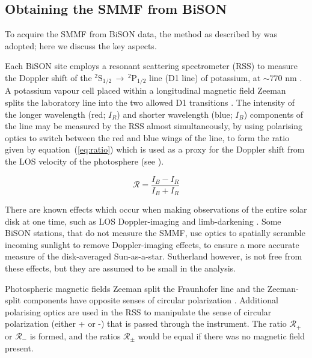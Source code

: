 \subsection{Obtaining the SMMF from BiSON}

To acquire the SMMF from BiSON data, the method as described by \citet{chaplin_studies_2003} was adopted; here we discuss the key aspects.

Each  BiSON site employs a resonant scattering spectrometer (RSS) to measure the Doppler shift of the $^{2}\mathrm{S}_{1/2} \, \rightarrow \, ^{2}\mathrm{P}_{1/2}$ line (D1 line) of potassium, at $\sim 770$ nm \citep{brookes_resonant-scattering_1978}. A potassium vapour cell placed within a longitudinal magnetic field Zeeman splits the laboratory line into the two allowed D1 transitions \citep{lund_spatial_2017}. The intensity of the longer wavelength (red; $I_R$) and shorter wavelength (blue; $I_B$) components of the line may be measured by the RSS almost simultaneously, by using polarising optics to switch between the red and blue wings of the line, to form the ratio given by equation~(\ref{eq:ratio}) which is used as a proxy for the Doppler shift from the LOS velocity of the photosphere (see \citet{brookes_observation_1976, brookes_resonant-scattering_1978, elsworth_performance_1995, chaplin_studies_2003, lund_spatial_2017}).  

\begin{equation}
\mathcal{R} = \frac{I_B - I_R}{I_B + I_R}
\label{eq:ratio}
\end{equation}

There are known effects which occur when making observations of the entire solar disk at one time, such as LOS Doppler-imaging and limb-darkening \citep{davies_bison_2014}. Some BiSON stations, that do not measure the SMMF, use optics to spatially scramble incoming sunlight to remove Doppler-imaging effects, to ensure a more accurate measure of the disk-averaged Sun-as-a-star. Sutherland however, is not free from these effects, but they are assumed to be small in the analysis.

Photospheric magnetic fields Zeeman split the Fraunhofer line and the Zeeman-split components have opposite senses of circular polarization \citep{chaplin_studies_2003}. Additional polarising optics are used in the RSS to manipulate the sense of circular polarization (either + or -) that is passed through the instrument. The ratio $\mathcal{R}_{+}$ or $\mathcal{R}_{-}$ is formed, and the ratios $\mathcal{R}_{\pm}$ would be equal if there was no magnetic field present.

